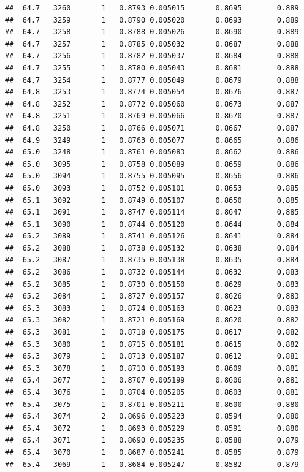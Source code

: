 \documentclass[
]{book}
\begin{document}
\begin{verbatim}
##  64.7   3260       1   0.8793 0.005015       0.8695        0.889
##  64.7   3259       1   0.8790 0.005020       0.8693        0.889
##  64.7   3258       1   0.8788 0.005026       0.8690        0.889
##  64.7   3257       1   0.8785 0.005032       0.8687        0.888
##  64.7   3256       1   0.8782 0.005037       0.8684        0.888
##  64.7   3255       1   0.8780 0.005043       0.8681        0.888
##  64.7   3254       1   0.8777 0.005049       0.8679        0.888
##  64.8   3253       1   0.8774 0.005054       0.8676        0.887
##  64.8   3252       1   0.8772 0.005060       0.8673        0.887
##  64.8   3251       1   0.8769 0.005066       0.8670        0.887
##  64.8   3250       1   0.8766 0.005071       0.8667        0.887
##  64.9   3249       1   0.8763 0.005077       0.8665        0.886
##  65.0   3248       1   0.8761 0.005083       0.8662        0.886
##  65.0   3095       1   0.8758 0.005089       0.8659        0.886
##  65.0   3094       1   0.8755 0.005095       0.8656        0.886
##  65.0   3093       1   0.8752 0.005101       0.8653        0.885
##  65.1   3092       1   0.8749 0.005107       0.8650        0.885
##  65.1   3091       1   0.8747 0.005114       0.8647        0.885
##  65.1   3090       1   0.8744 0.005120       0.8644        0.884
##  65.2   3089       1   0.8741 0.005126       0.8641        0.884
##  65.2   3088       1   0.8738 0.005132       0.8638        0.884
##  65.2   3087       1   0.8735 0.005138       0.8635        0.884
##  65.2   3086       1   0.8732 0.005144       0.8632        0.883
##  65.2   3085       1   0.8730 0.005150       0.8629        0.883
##  65.2   3084       1   0.8727 0.005157       0.8626        0.883
##  65.3   3083       1   0.8724 0.005163       0.8623        0.883
##  65.3   3082       1   0.8721 0.005169       0.8620        0.882
##  65.3   3081       1   0.8718 0.005175       0.8617        0.882
##  65.3   3080       1   0.8715 0.005181       0.8615        0.882
##  65.3   3079       1   0.8713 0.005187       0.8612        0.881
##  65.3   3078       1   0.8710 0.005193       0.8609        0.881
##  65.4   3077       1   0.8707 0.005199       0.8606        0.881
##  65.4   3076       1   0.8704 0.005205       0.8603        0.881
##  65.4   3075       1   0.8701 0.005211       0.8600        0.880
##  65.4   3074       2   0.8696 0.005223       0.8594        0.880
##  65.4   3072       1   0.8693 0.005229       0.8591        0.880
##  65.4   3071       1   0.8690 0.005235       0.8588        0.879
##  65.4   3070       1   0.8687 0.005241       0.8585        0.879
##  65.4   3069       1   0.8684 0.005247       0.8582        0.879

\end{verbatim}
\end{document}
